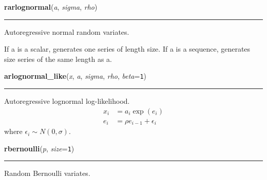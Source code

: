     \begin{boxedminipage}{\textwidth}

    \raggedright \textbf{rarlognormal}(\textit{a}, \textit{sigma}, \textit{rho})

    \vspace{-1.5ex}

    \rule{\textwidth}{0.5\fboxrule}

Autoregressive normal random variates.

If a is a scalar, generates one series of length size.
If a is a sequence, generates size series of the same length
as a.
    \vspace{1ex}

    \end{boxedminipage}

    \label{pymc:distributions:arlognormal_like}

    \vspace{0.5ex}

    \begin{boxedminipage}{\textwidth}

    \raggedright \textbf{arlognormal\_like}(\textit{x}, \textit{a}, \textit{sigma}, \textit{rho}, \textit{beta}=\texttt{1})

    \vspace{-1.5ex}

    \rule{\textwidth}{0.5\fboxrule}

Autoregressive lognormal log-likelihood.
\begin{equation*}\begin{split}x_i & = a_i \exp(e_i) \\e_i & = \rho e_{i-1} + \epsilon_i\end{split}\end{equation*}
where $\epsilon_i \sim N(0,\sigma)$.
    \vspace{1ex}

    \end{boxedminipage}

    \label{pymc:distributions:rbernoulli}

    \vspace{0.5ex}

    \begin{boxedminipage}{\textwidth}

    \raggedright \textbf{rbernoulli}(\textit{p}, \textit{size}=\texttt{1})

    \vspace{-1.5ex}

    \rule{\textwidth}{0.5\fboxrule}

Random Bernoulli variates.
    \vspace{1ex}

    \end{boxedminipage}

